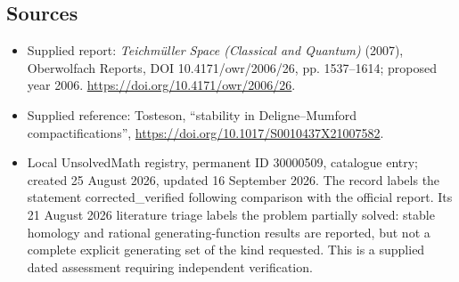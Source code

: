 \documentclass[11pt]{article}
\begin{document}
\subsection{Sources}
\begin{itemize}
\item Supplied report: \emph{Teichmüller Space (Classical and Quantum)} (2007), Oberwolfach Reports, DOI 10.4171/owr/2006/26, pp. 1537--1614; proposed year 2006. \url{https://doi.org/10.4171/owr/2006/26}.
\item Supplied reference: Tosteson, ``stability in Deligne--Mumford compactifications'', \url{https://doi.org/10.1017/S0010437X21007582}.
\item Local UnsolvedMath registry, permanent ID 30000509, catalogue entry; created 25 August 2026, updated 16 September 2026. The record labels the statement corrected\_verified following comparison with the official report. Its 21 August 2026 literature triage labels the problem partially solved: stable homology and rational generating-function results are reported, but not a complete explicit generating set of the kind requested. This is a supplied dated assessment requiring independent verification.
\end{itemize}
\end{document}
